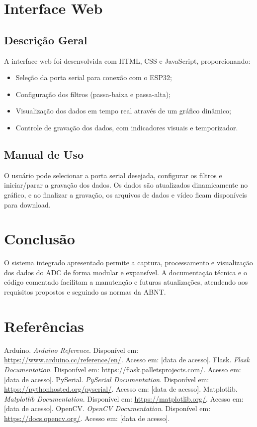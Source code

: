 \documentclass[12pt,a4paper]{article}
\begin{document}
\section{Interface Web}
\subsection{Descrição Geral}
A interface web foi desenvolvida com HTML, CSS e JavaScript, proporcionando:
\begin{itemize}
    \item Seleção da porta serial para conexão com o ESP32;
    \item Configuração dos filtros (passa-baixa e passa-alta);
    \item Visualização dos dados em tempo real através de um gráfico dinâmico;
    \item Controle de gravação dos dados, com indicadores visuais e temporizador.
\end{itemize}

\subsection{Manual de Uso}
O usuário pode selecionar a porta serial desejada, configurar os filtros e iniciar/parar a gravação dos dados. Os dados são atualizados dinamicamente no gráfico, e ao finalizar a gravação, os arquivos de dados e vídeo ficam disponíveis para download.

\section{Conclusão}
O sistema integrado apresentado permite a captura, processamento e visualização dos dados do ADC de forma modular e expansível. A documentação técnica e o código comentado facilitam a manutenção e futuras atualizações, atendendo aos requisitos propostos e seguindo as normas da ABNT.

\section{Referências}
\begin{thebibliography}{9}
Arduino. \textit{Arduino Reference}. Disponível em: \url{https://www.arduino.cc/reference/en/}. Acesso em: [data de acesso].
Flask. \textit{Flask Documentation}. Disponível em: \url{https://flask.palletsprojects.com/}. Acesso em: [data de acesso].
PySerial. \textit{PySerial Documentation}. Disponível em: \url{https://pythonhosted.org/pyserial/}. Acesso em: [data de acesso].
Matplotlib. \textit{Matplotlib Documentation}. Disponível em: \url{https://matplotlib.org/}. Acesso em: [data de acesso].
OpenCV. \textit{OpenCV Documentation}. Disponível em: \url{https://docs.opencv.org/}. Acesso em: [data de acesso].
\end{thebibliography}
\end{document}
